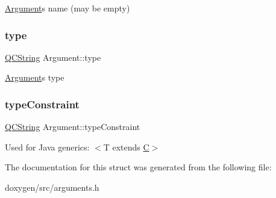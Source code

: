 \mbox{\hyperlink{struct_argument}{Argument}}\textquotesingle{}s name (may be empty) \mbox{\label{struct_argument_a1ad588d2b3cc71fe3f74c8272b4ec32e}} 
\subsubsection{\texorpdfstring{type}{type}}
{\footnotesize\ttfamily \mbox{\hyperlink{class_q_c_string}{Q\+C\+String}} Argument\+::type}

\mbox{\hyperlink{struct_argument}{Argument}}\textquotesingle{}s type \mbox{\label{struct_argument_aef7bdd7c7d69ebad70624bfebdfa7404}} 
\subsubsection{\texorpdfstring{typeConstraint}{typeConstraint}}
{\footnotesize\ttfamily \mbox{\hyperlink{class_q_c_string}{Q\+C\+String}} Argument\+::type\+Constraint}

Used for Java generics\+: $<$T extends \mbox{\hyperlink{class_c}{C}}$>$ 

The documentation for this struct was generated from the following file\+:\begin{DoxyCompactItemize}
\item 
doxygen/src/arguments.\+h\end{DoxyCompactItemize}
